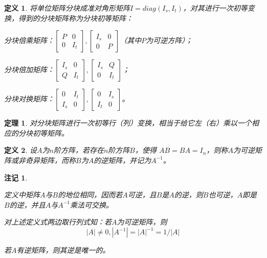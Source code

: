 \documentclass[a4paper]{book}
\newtheorem{Def}{定义}[chapter]
\newtheorem{thm}{定理}[chapter]
\newtheorem{rmk}{注记}[chapter]
\newcommand{\enum}{\begin{list}{}{\setlength{\leftmargin}{0pt} \setlength{\itemindent}{2.5em} \setlength{\listparindent}{2em}}}
\begin{document}
\begin{Def}
将单位矩阵分块成准对角形矩阵$I = diag(I_s, I_t)$，对其进行一次初等变换，得到的分块矩阵称为分块初等矩阵：
\enum
\item[(1)] 分块倍乘矩阵：$\begin{bmatrix} P & 0 \\ 0 & I_t \end{bmatrix}, \begin{bmatrix} I_s & 0 \\ 0 & P \end{bmatrix}$（其中$P$为可逆方阵）；
\item[(2)] 分块倍加矩阵：$\begin{bmatrix} I_s & 0 \\ Q & I_t \end{bmatrix}, \begin{bmatrix} I_s & Q \\ 0 & I_t \end{bmatrix}$；
\item[(3)] 分块对换矩阵：$\begin{bmatrix} 0 & I_t \\ I_s & 0 \end{bmatrix}, \begin{bmatrix} 0 & I_s \\ I_t & 0 \end{bmatrix}$。
\end{list}
\end{Def}

\begin{thm}
对分块矩阵进行一次初等行（列）变换，相当于给它左（右）乘以一个相应的分块初等矩阵。
\end{thm}

\begin{Def}
设$A$为$n$阶方阵，若存在$n$阶方阵$B$，使得 $AB = BA = I_n$，则称$A$为可逆矩阵或非奇异矩阵，而称$B$为$A$的逆矩阵，并记为$A^{-1}$。
\end{Def}

\begin{rmk}\

\enum
\item[(1)] 定义中矩阵$A$与$B$的地位相同，因而若$A$可逆，且$B$是$A$的逆，则$B$也可逆，$A$即是$B$的逆，并且$A$与$A^{-1}$乘法可交换。
\item[(2)] 对上述定义式两边取行列式知：若$A$为可逆矩阵，则
$$|A|\neq 0, |A^{-1}| = |A|^{-1} = 1 / |A|$$
\item[(3)] 若$A$有逆矩阵，则其逆是唯一的。
\end{list}
\end{rmk}
\end{document}
